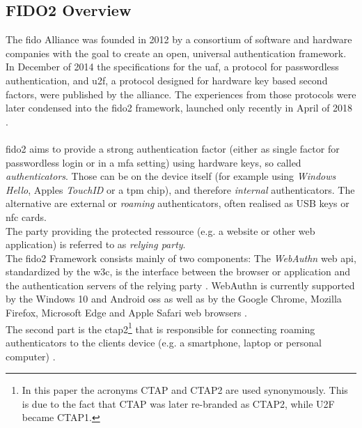 \subsection{FIDO2 Overview}
\label{subsec:fido2_webauthn}

The \ac{fido} Alliance was founded in 2012 by a consortium of software and hardware companies with the goal to create an open, universal authentication framework. In December of 2014 the specifications for the \acl{uaf}, a protocol for passwordless authentication, and \acl{u2f}, a protocol designed for hardware key based second factors, were published by the alliance. The experiences from those protocols were later condensed into the \ac{fido2} framework, launched only recently in April of 2018 \cite{fido_history}.\\
\\
\ac{fido2} aims to provide a strong authentication factor (either as single factor for passwordless login or in a \ac{mfa} setting) using hardware keys, so called \emph{authenticators}. Those can be on the device itself (for example using \emph{Windows Hello}, Apples \emph{TouchID} or a \ac{tpm} chip), and therefore \emph{internal} authenticators. The alternative are external or \emph{roaming} authenticators, often realised as USB keys or \ac{nfc} cards.\\
The party providing the protected ressource (e.g. a website or other web application) is referred to as \emph{relying party}.\\
The \ac{fido2} Framework consists mainly of two components: The \emph{WebAuthn} web \ac{api}, standardized by the \ac{w3c}, is the interface between the browser or application and the authentication servers of the relying party \cite{webauthn_standard}. WebAuthn is currently supported by the Windows 10 and Android \acp{os} as well as by the Google Chrome, Mozilla Firefox, Microsoft Edge and Apple Safari web browsers \cite{fido2_webauthn}.\\
The second part is the \ac{ctap2}\footnote{In this paper the acronyms CTAP and CTAP2 are used synonymously. This is due to the fact that CTAP was later re-branded as CTAP2, while U2F became CTAP1.} that is responsible for connecting roaming authenticators to the clients device (e.g. a smartphone, laptop or personal computer) \cite{fido2_overview,fido2_ctap}.\\

